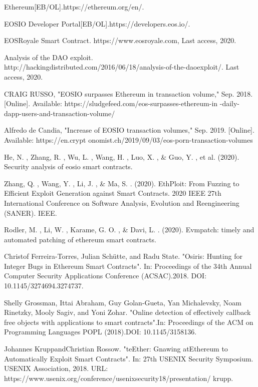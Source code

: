 \documentclass{SCIS2022cn}
\begin{document}
\begin{thebibliography}{99}

     Ethereum[EB/OL].https://ethereum.org/en/.

     EOSIO Developer Portal[EB/OL].https://developers.eos.io/.

     EOSRoyale Smart Contract. https://www.eosroyale.com, Last access, 2020.

     Analysis of the DAO exploit. http://hackingdistributed.com/2016/06/18/analysis-of-the-daoexploit/. Last access, 2020.

     CRAIG RUSSO, "EOSIO surpasses Ethereum in transaction volume," Sep. 2018. [Online]. Available: https://sludgefeed.com/eos-surpasses-ethereum-in -daily-dapp-users-and-transaction-volume/

     Alfredo de Candia, "Increase of EOSIO transaction volumes," Sep. 2019. [Online]. Available: https://en.crypt onomist.ch/2019/09/03/eos-porn-transaction-volumes

     He, N. ,  Zhang, R. ,  Wu, L. ,  Wang, H. ,  Luo, X. , \&  Guo, Y. , et al. (2020). Security analysis of eosio smart contracts.

     Zhang, Q. ,  Wang, Y. ,  Li, J. , \&  Ma, S. . (2020). EthPloit: From Fuzzing to Efficient Exploit Generation against Smart Contracts. 2020 IEEE 27th International Conference on Software Analysis, Evolution and Reengineering (SANER). IEEE.

     Rodler, M. ,  Li, W. ,  Karame, G. O. , \&  Davi, L. . (2020). Evmpatch: timely and automated patching of ethereum smart contracts.

     Christof Ferreira-Torres, Julian Schütte, and Radu State. "Osiris: Hunting for Integer Bugs in Ethereum Smart Contracts". In: Proceedings of the 34th Annual Computer Security Applications Conference (ACSAC).2018. DOI: 10.1145/3274694.3274737.

     Shelly Grossman, Ittai Abraham, Guy Golan-Gueta, Yan Michalevsky, Noam Rinetzky, Mooly Sagiv, and Yoni Zohar. "Online detection of effectively callback free objects with applications to smart contracts".In: Proceedings of the ACM on Programming Languages POPL (2018).DOI: 10.1145/3158136.

     Johannes KruppandChristian Rossow. "teEther: Gnawing atEthereum to Automatically Exploit Smart Contracts". In: 27th USENIX Security Symposium. USENIX Association, 2018. URL: https://www.usenix.org/conference/usenixsecurity18/presentation/ krupp.


\end{thebibliography}
\end{document}
